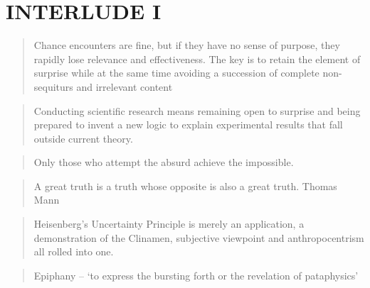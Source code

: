 
\pagestyle{empty}

\chapter*{INTERLUDE I}
\label{interlude1}



\begin{quotation}
    Chance encounters are fine, but if they have no sense of purpose, they rapidly lose relevance and effectiveness. The key is to retain the element of surprise while at the same time avoiding a succession of complete non-sequiturs and irrelevant content 
\end{quotation}

\begin{quotation}
    Conducting scientific research means remaining open to surprise and being prepared to invent a new logic to explain experimental results that fall outside current theory. 
\end{quotation}

\begin{quotation}
    Only those who attempt the absurd achieve the impossible. 
\end{quotation}

\begin{quotation}
    A great truth is a truth whose opposite is also a great truth. Thomas Mann 
\end{quotation}

\begin{quotation}
    Heisenberg's Uncertainty Principle is merely an application, a demonstration of the Clinamen, subjective viewpoint and anthropocentrism all rolled into one. 
\end{quotation}

\begin{quotation}
  Epiphany – `to express the bursting forth or the revelation of pataphysics' 
\end{quotation}

\clearpage